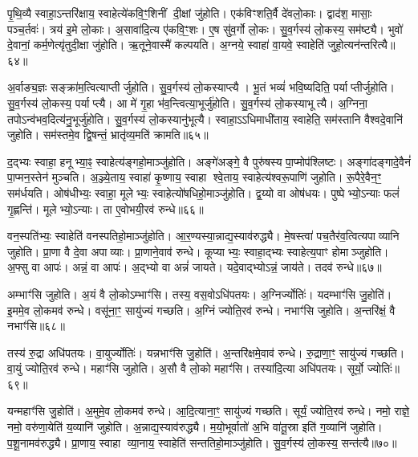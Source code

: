 पृ॒थि॒व्यै स्वाहा॒\-ऽन्तरि॑क्षाय॒ स्वाहेत्ये॑कवि॒ꣳ॒शिनीं दी॒क्षां जु॑होति।
एक॑विꣳशति॒र्वै दे॑वलो॒काः।
द्वाद॑श॒ मासाः॒ पञ्च॒र्तवः॑।
त्रय॑ इ॒मे लो॒काः।
अ॒सावा॑दि॒त्य ए॑कवि॒ꣳ॒शः।
ए॒ष सु॑व॒र्गो लो॒कः।
सु॒व॒र्गस्य॑ लो॒कस्य॒ सम॑ष्ट्यै।
भुवो॑ दे॒वानां॒ कर्म॒णेत्यृ॑तुदी॒क्षा जु॑होति।
ऋ॒तूने॒वास्मै॑ कल्पयति।
अ॒ग्नये॒ स्वाहा॑ वा॒यवे॒ स्वाहेति॑ जुहो॒त्यन॑न्तरित्यै॥६४॥

अ॒र्वाङ्य॒ज्ञः सङ्क्रा॑म॒त्वित्याप्तीर्जुहोति।
सु॒व॒र्गस्य॑ लो॒कस्याप्त्यै।
भू॒तं भव्यं॑ भवि॒ष्यदिति॒ पर्याप्तीर्जुहोति।
सु॒व॒र्गस्य॑ लो॒कस्य॒ पर्याप्त्यै।
आ मे॑ गृ॒हा भ॑व॒न्त्वित्या॒भूर्जु॑होति।
सु॒व॒र्गस्य॑ लो॒कस्याभूत्यै।
अ॒ग्निना॒ तपो\-ऽन्व॑भव॒दित्य॑नु॒भूर्जु॑होति।
सु॒व॒र्गस्य॑ लो॒कस्यानु॑भूत्यै।
स्वाहा॒\-ऽऽधिमाधी॑ताय॒ स्वाहेति॒ सम॑स्तानि वैश्वदे॒वानि॑ जुहोति।
सम॑स्तमे॒व द्वि॒षन्तं॒ भ्रातृ॑व्य॒मति॑ क्रामति॥६५॥

द॒द्भ्यः स्वाहा॒ हनूभ्या॒ꣴ॒ स्वाहेत्य॑ङ्गहो॒माञ्जु॑होति।
अङ्गे॑अङ्गे॒ वै पुरु॑षस्य पा॒प्मोप॑श्लिष्टः।
अङ्गा॑दङ्गादे॒वैनं॑ पा॒प्मन॒स्तेन॑ मुञ्चति।
अ॒ञ्ज्ये॒ताय॒ स्वाहा॑ कृ॒ष्णाय॒ स्वाहा श्वे॒ताय॒ स्वाहेत्य॑श्वरू॒पाणि॑ जुहोति।
रू॒पैरे॒वैन॒ꣳ॒ सम॑र्धयति।
ओष॑धीभ्यः॒ स्वाहा॒ मूलेभ्यः॒ स्वाहेत्यो॑षधिहो॒माञ्जु॑होति।
द्व॒य्यो वा ओष॑धयः।
पुष्पेभ्यो॒\-ऽन्याः फलं॑ गृ॒ह्णन्ति॑।
मूलेभ्यो॒\-ऽन्याः।
ता ए॒वोभयी॒रव॑ रुन्धे॥६६॥

वन॒स्पति॑भ्यः॒ स्वाहेति॑ वनस्पतिहो॒माञ्जु॑होति।
आ॒र॒ण्यस्या॒न्नाद्य॒स्याव॑रुद्ध्यै।
मे॒षस्त्वा॑ पच॒तैर॑व॒त्वित्यपाव्यानि जुहोति।
प्रा॒णा वै दे॒वा अपाव्याः।
प्रा॒णाने॒वाव॑ रुन्धे।
कूप्याभ्यः॒ स्वाहा॒द्भ्यः स्वाहेत्य॒पाꣳ होमाञ्जुहोति।
अ॒फ्सु वा आपः॑।
अन्नं॒ वा आपः॑।
अ॒द्भ्यो वा अन्नं॑ जायते।
यदे॒वाद्भ्यो\-ऽन्नं॒ जाय॑ते।
तदव॑ रुन्धे॥६७॥\anuvakamend[पू॒र्व॒दी॒क्षा जु॑होति॒ पूर्व॑ ए॒व द्वि॒षन्तं॒ भ्रातृ॑व्य॒मति॑ क्राम॒त्यन॑न्तरित्यै क्रामति रुन्धे॒ जाय॑त॒ एकं॑ च]

अम्भाꣳ॑सि जुहोति।
अ॒यं वै लो॒को\-ऽम्भाꣳ॑सि।
तस्य॒ वस॒वो\-ऽधि॑पतयः।
अ॒ग्निर्ज्योतिः॑।
यदम्भाꣳ॑सि जु॒होति॑।
इ॒ममे॒व लो॒कमव॑ रुन्धे।
वसू॑ना॒ꣳ॒ सायु॑ज्यं गच्छति।
अ॒ग्निं ज्योति॒रव॑ रुन्धे।
नभाꣳ॑सि जुहोति।
अ॒न्तरि॑क्षं॒ वै नभाꣳ॑सि॥६८॥

तस्य॑ रु॒द्रा अधि॑पतयः।
वा॒युर्ज्योतिः॑।
यन्नभाꣳ॑सि जु॒होति॑।
अ॒न्तरि॑क्षमे॒वाव॑ रुन्धे।
रु॒द्राणा॒ꣳ॒ सायु॑ज्यं गच्छति।
वा॒युं ज्योति॒रव॑ रुन्धे।
महाꣳ॑सि जुहोति।
अ॒सौ वै लो॒को महाꣳ॑सि।
तस्या॑दि॒त्या अधि॑पतयः।
सूर्यो॒ ज्योतिः॑॥६९॥

यन्महाꣳ॑सि जु॒होति॑।
अ॒मुमे॒व लो॒कमव॑ रुन्धे।
आ॒दि॒त्याना॒ꣳ॒ सायु॑ज्यं गच्छति।
सूर्यं॒ ज्योति॒रव॑ रुन्धे।
नमो॒ राज्ञे॒ नमो॒ वरु॑णा॒येति॑ य॒व्यानि॑ जुहोति।
अ॒न्नाद्य॒स्याव॑रुद्ध्यै।
म॒यो॒भूर्वातो॑ अ॒भि वा॑तू॒स्रा इति॑ ग॒व्यानि॑ जुहोति।
प॒शू॒नामव॑रुद्ध्यै।
प्रा॒णाय॒ स्वाहा व्या॒नाय॒ स्वाहेति॑ सन्ततिहो॒माञ्जु॑होति।
सु॒व॒र्गस्य॑ लो॒कस्य॒ सन्त॑त्यै॥७०॥

